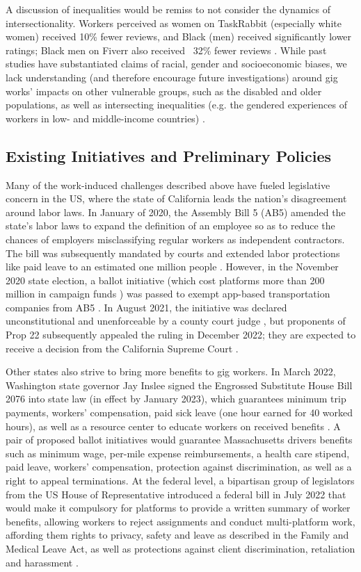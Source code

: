 A discussion of inequalities would be remiss to not consider the dynamics of intersectionality. Workers perceived as women on TaskRabbit (especially white women) received 10\% fewer reviews, and Black (men) received significantly lower ratings; Black men on Fiverr also received ~32\% fewer reviews \cite{Hannak2017-xn}. While past studies have substantiated claims of racial, gender and socioeconomic biases, we lack understanding (and therefore encourage future investigations) around gig works' impacts on other vulnerable groups, such as the disabled and older populations, as well as intersecting inequalities (e.g. the gendered experiences of workers in low- and middle-income countries) \cite{Barakat2022-tz,Hunt2019-qb}.

\subsection{Existing Initiatives and Preliminary Policies}
Many of the work-induced challenges described above have fueled legislative concern in the US, where the state of California leads the nation's disagreement around labor laws. In January of 2020, the Assembly Bill 5 (AB5) amended the state's labor laws to expand the definition of an employee so as to reduce the chances of employers misclassifying regular workers as independent contractors. The bill was subsequently mandated by courts and extended labor protections like paid leave to an estimated one million people \cite{noauthor_2021-px}. However, in the November 2020 state election, a ballot initiative (which cost platforms more than 200 million in campaign funds \cite{Stecker2020-xk}) was passed to exempt app-based transportation companies from AB5 \cite{Hussain2022-lr}. In August 2021, the initiative was declared unconstitutional and unenforceable by a county court judge \cite{Gedye2023-ru, unconstitutional}, but proponents of Prop 22 subsequently appealed the ruling in December 2022; they are expected to receive a decision from the California Supreme Court \cite{Yakal2023-ka}.

Other states also strive to bring more benefits to gig workers. In March 2022, Washington state governor Jay Inslee signed the Engrossed Substitute House Bill 2076 into state law (in effect by January 2023), which guarantees minimum trip payments, workers' compensation, paid sick leave (one hour earned for 40 worked hours), as well as a resource center to educate workers on received benefits \cite{Fletcher2022-qr}. A pair of proposed ballot initiatives would guarantee Massachusetts drivers benefits such as minimum wage, per-mile expense reimbursements, a health care stipend, paid leave, workers' compensation, protection against discrimination, as well as a right to appeal terminations. At the federal level, a bipartisan group of legislators from the US House of Representative introduced a federal bill in July 2022 that would make it compulsory for platforms to provide a written summary of worker benefits, allowing workers to reject assignments and conduct multi-platform work, affording them rights to privacy, safety and leave as described in the Family and Medical Leave Act, as well as protections against client discrimination, retaliation and harassment \cite{Shepherd2022-ed}.

